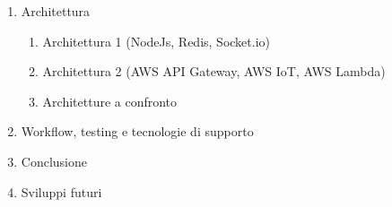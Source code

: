 \documentclass[a4paper,11pt]{report}
\begin{document}
\begin{enumerate}[label*=\arabic*.]
\item Architettura
\begin{enumerate}[label*=\arabic*.]
	\item Architettura 1 (NodeJs, Redis, Socket.io)
	\item Architettura 2 (AWS API Gateway, AWS IoT, AWS Lambda)
	\item Architetture a confronto
\end{enumerate}

\item Workflow, testing e tecnologie di supporto
\item Conclusione
\item Sviluppi futuri
\end{enumerate}









\end{document}
